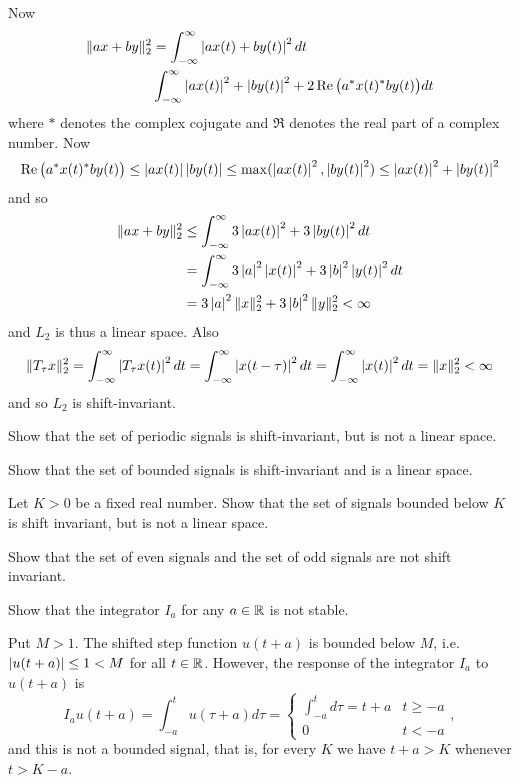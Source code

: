 \begin{excersizelist}
\begin{solution}
Now
\begin{align*}
\|a x + b y\|_2^2 &= \int_{-\infty}^\infty \left\vert ax(t) + by(t) \right\vert^2 dt \\
& \int_{-\infty}^\infty \left\vert a x(t) \right\vert^2 + \left\vert  b y(t) \right\vert^2 + 2 \operatorname{Re}\big( a^* x(t)^* b y(t) \big) dt
\end{align*}
where $*$ denotes the complex cojugate and $\Re$ denotes the real part of a complex number.  Now
\[
\operatorname{Re}\big( a^* x(t)^* b y(t) \big) \leq \left\vert a x(t) \right\vert \left\vert b y(t) \right\vert \leq \max(\left\vert a x(t) \right\vert^2, \left\vert b y(t) \right\vert^2) \leq \left\vert a x(t) \right\vert^2 + \left\vert b y(t) \right\vert^2
\]
and so
\begin{align*}
\|a x + b y\|_2^2 &\leq \int_{-\infty}^\infty 3\left\vert a x(t) \right\vert^2 + 3\left\vert  b y(t) \right\vert^2 dt \\
&= \int_{-\infty}^\infty 3\left\vert a \right\vert^2\left\vert x(t) \right\vert^2 + 3\left\vert b \right\vert^2\left\vert  y(t) \right\vert^2 dt \\
&= 3 \left\vert a \right\vert^2 \|x\|_2^2 + 3 \left\vert b \right\vert^2 \|y\|_2^2 < \infty
\end{align*}
and $L_2$ is thus a linear space.  Also
\[
\|T_\tau x\|_2^2 = \int_{-\infty}^\infty \left\vert  T_\tau x(t)  \right\vert^2 dt = \int_{-\infty}^\infty \left\vert x(t - \tau) \right\vert^2 dt = \int_{-\infty}^\infty \left\vert x(t) \right\vert^2 dt = \|x\|_2^2 < \infty
\]
and so $L_2$ is shift-invariant.
\end{solution}

\item \label{exer:periodicshiftinvariantnotlinear} Show that the set of periodic signals is shift-invariant, but is not a linear space.

\item \label{exer:boundedlinearshiftinvar} Show that the set of bounded signals is shift-invariant and is a linear space.

\item \label{exer:boundconstantnotlinear} Let $K > 0$ be a fixed real number. Show that the set of signals bounded below $K$ is shift invariant, but is not a linear space. 

\item \label{exer:evenoddnoshiftinvariant} Show that the set of even signals and the set of odd signals are not shift invariant.

\item \label{excer:integratornotstable} Show that the integrator $I_a$ for any $a\in{\mathbb R}$ is not  stable.
\begin{solution}
Put $M > 1$.  The shifted step function $u(t + a)$ is bounded below $M$, i.e. $\vert u(t+a) \vert \leq 1 < M$ for all $t \in {\mathbb R}$.  However, the response of the integrator $I_a$ to $u(t+a)$ is
\[
I_au(t+a) = \int_{-a}^t u(\tau + a)d\tau = \begin{cases}
\int_{-a}^t d\tau = t + a & t \geq -a \\
0 & t < -a 
\end{cases},
\]
and this is not a bounded signal, that is, for every $K$ we have $t + a > K$ whenever $t > K - a$.
\end{solution}


\end{excersizelist}
